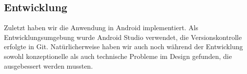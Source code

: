 \subsection{Entwicklung}
Zuletzt haben wir die Anwendung in Android implementiert. Als Entwicklungsumgebung wurde Android Studio verwendet, die Versionskontrolle erfolgte in Git. Natürlicherweise haben wir auch noch während der Entwicklung sowohl konzeptionelle als auch technische Probleme im Design gefunden, die ausgebessert werden mussten.